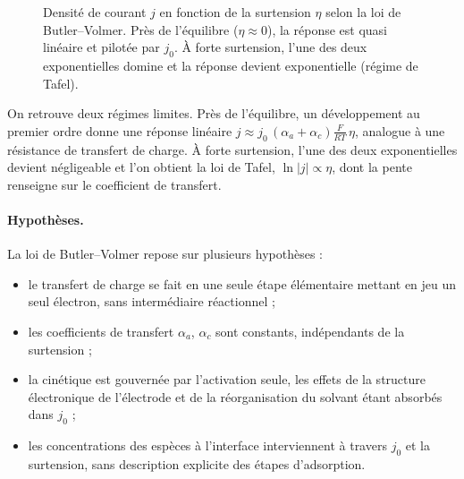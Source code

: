 \begin{figure}[htbp]
\centering
{}
\caption{Densité de courant $j$ en fonction de la surtension $\eta$ selon la
loi de Butler--Volmer. Près de l'équilibre ($\eta \approx 0$), la réponse est
quasi linéaire et pilotée par $j_0$. À forte surtension, l'une des deux
exponentielles domine et la réponse devient exponentielle (régime de Tafel).}
\label{fig:bv_courbe}
\end{figure}

On retrouve deux régimes limites. Près de l'équilibre, un développement au
premier ordre donne une réponse linéaire $j \approx j_0\,(\alpha_a +
\alpha_c)\frac{F}{RT}\,\eta$, analogue à une résistance de transfert de
charge. À forte surtension, l'une des deux exponentielles devient
négligeable et l'on obtient la loi de Tafel, $\ln|j| \propto \eta$, dont la
pente renseigne sur le coefficient de transfert.

\paragraph{Hypothèses.}
La loi de Butler--Volmer repose sur plusieurs hypothèses
\cite{dickinsonButlerVolmerEquationElectrochemical2020} :
\begin{itemize}
  \item le transfert de charge se fait en une seule étape élémentaire
        mettant en jeu un seul électron, sans intermédiaire réactionnel ;
  \item les coefficients de transfert $\alpha_a$, $\alpha_c$ sont
        constants, indépendants de la surtension ;
  \item la cinétique est gouvernée par l'activation seule, les effets de la
        structure électronique de l'électrode et de la réorganisation du
        solvant étant absorbés dans $j_0$ ;
  \item les concentrations des espèces à l'interface interviennent à travers
        $j_0$ et la surtension, sans description explicite des étapes
        d'adsorption.
\end{itemize}

